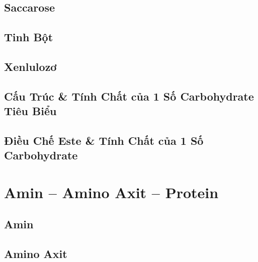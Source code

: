 \documentclass{article}
\numberwithin{equation}{section}
\begin{document}

\subsection{Saccarose}


\subsection{Tinh Bột}


\subsection{Xenlulozơ}


\subsection{Cấu Trúc \& Tính Chất của 1 Số Carbohydrate Tiêu Biểu}


\subsection{Điều Chế Este \& Tính Chất của 1 Số Carbohydrate}


\section{Amin -- Amino Axit -- Protein}

\subsection{Amin}


\subsection{Amino Axit}
\end{document}
